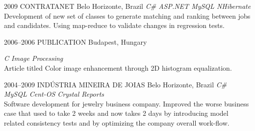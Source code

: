 \documentclass[]{friggeri-cv}
\begin{document}
\begin{entrylist}
\entry
{2009}
{CONTRATANET}
{Belo Horizonte, Brazil}
{\emph{\bullet C\# \bullet ASP.NET \bullet MySQL \bullet NHibernate } \\Development of new set of classes to generate matching and ranking between jobs and candidates. Using map-reduce to validate changes in regression tests. }

 \entry
 {2006--2006}
 {PUBLICATION}
 {Budapest, Hungary}
 {\emph{\bullet C \bullet Image Processing } \\ Article titled Color image enhancement through 2D histogram equalization. 
 
}

 \entry
 {2004--2009}
 {INDÚSTRIA MINEIRA DE JOIAS}
 {Belo Horizonte, Brazil}
 {\emph{\bullet C\# \bullet MySQL \bullet Cent-OS \bullet Crystal Reports } \\ Software development for jewelry business company.
  Improved the worse business case that used to take 2 weeks and now takes 2 days by introducing model related consistency tests and by optimizing the company overall work-flow. }


\end{entrylist}
\end{document}
